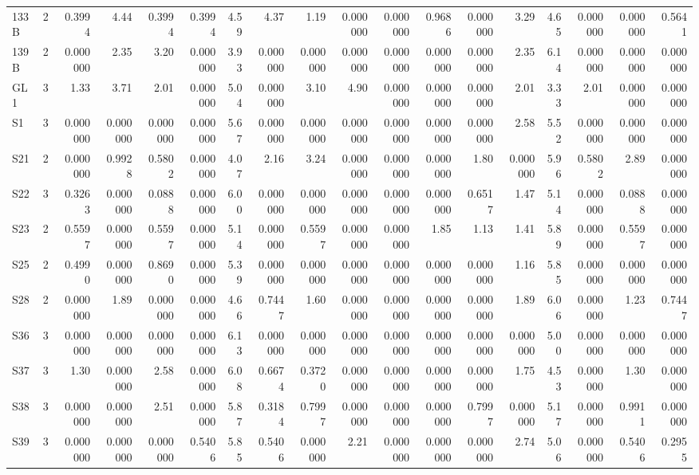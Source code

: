 {\begin{longtable}{lrrrrrrrrrrrrrrrrr}
  133B & 2 & 0.3994 & 4.44 & 0.3994 & 0.3994 & 4.59 & 4.37 & 1.19 & 0.000000 & 0.000000 & 0.9686 & 0.000000 & 3.29 & 4.65 & 0.000000 & 0.000000 & 0.5641 \\
  139B & 2 & 0.000000 & 2.35 & 3.20 & 0.000000 & 3.93 & 0.000000 & 0.000000 & 0.000000 & 0.000000 & 0.000000 & 0.000000 & 2.35 & 6.14 & 0.000000 & 0.000000 & 0.000000 \\
  GL1 & 3 & 1.33 & 3.71 & 2.01 & 0.000000 & 5.04 & 0.000000 & 3.10 & 4.90 & 0.000000 & 0.000000 & 0.000000 & 2.01 & 3.33 & 2.01 & 0.000000 & 0.000000 \\
  S1 & 3 & 0.000000 & 0.000000 & 0.000000 & 0.000000 & 5.67 & 0.000000 & 0.000000 & 0.000000 & 0.000000 & 0.000000 & 0.000000 & 2.58 & 5.52 & 0.000000 & 0.000000 & 0.000000 \\
  S21 & 2 & 0.000000 & 0.9928 & 0.5802 & 0.000000 & 4.07 & 2.16 & 3.24 & 0.000000 & 0.000000 & 0.000000 & 1.80 & 0.000000 & 5.96 & 0.5802 & 2.89 & 0.000000 \\
  S22 & 3 & 0.3263 & 0.000000 & 0.0888 & 0.000000 & 6.00 & 0.000000 & 0.000000 & 0.000000 & 0.000000 & 0.000000 & 0.6517 & 1.47 & 5.14 & 0.000000 & 0.0888 & 0.000000 \\
  S23 & 2 & 0.5597 & 0.000000 & 0.5597 & 0.000000 & 5.14 & 0.000000 & 0.5597 & 0.000000 & 0.000000 & 1.85 & 1.13 & 1.41 & 5.89 & 0.000000 & 0.5597 & 0.000000 \\
  S25 & 2 & 0.4990 & 0.000000 & 0.8690 & 0.000000 & 5.39 & 0.000000 & 0.000000 & 0.000000 & 0.000000 & 0.000000 & 0.000000 & 1.16 & 5.85 & 0.000000 & 0.000000 & 0.000000 \\
  S28 & 2 & 0.000000 & 1.89 & 0.000000 & 0.000000 & 4.66 & 0.7447 & 1.60 & 0.000000 & 0.000000 & 0.000000 & 0.000000 & 1.89 & 6.06 & 0.000000 & 1.23 & 0.7447 \\
  S36 & 3 & 0.000000 & 0.000000 & 0.000000 & 0.000000 & 6.13 & 0.000000 & 0.000000 & 0.000000 & 0.000000 & 0.000000 & 0.000000 & 0.000000 & 5.00 & 0.000000 & 0.000000 & 0.000000 \\
  S37 & 3 & 1.30 & 0.000000 & 2.58 & 0.000000 & 6.08 & 0.6674 & 0.3720 & 0.000000 & 0.000000 & 0.000000 & 0.000000 & 1.75 & 4.53 & 0.000000 & 1.30 & 0.000000 \\
  S38 & 3 & 0.000000 & 0.000000 & 2.51 & 0.000000 & 5.87 & 0.3184 & 0.7997 & 0.000000 & 0.000000 & 0.000000 & 0.7997 & 0.000000 & 5.17 & 0.000000 & 0.9911 & 0.000000 \\
  S39 & 3 & 0.000000 & 0.000000 & 0.000000 & 0.5406 & 5.85 & 0.5406 & 0.000000 & 2.21 & 0.000000 & 0.000000 & 0.000000 & 2.74 & 5.06 & 0.000000 & 0.5406 & 0.2955 \\

\end{longtable}}
